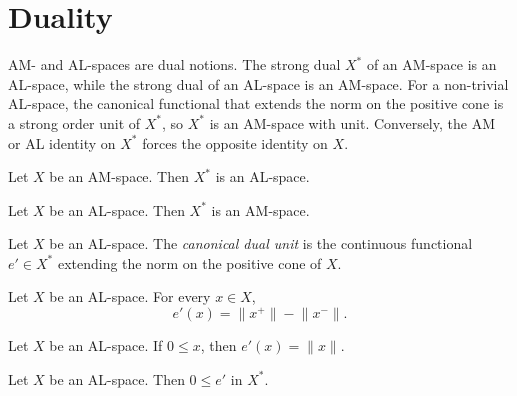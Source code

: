 \section{Duality}

AM- and AL-spaces are dual notions. The strong dual $X^{*}$ of an
AM-space is an AL-space, while the strong dual of an AL-space is an
AM-space. For a non-trivial AL-space, the canonical functional that
extends the norm on the positive cone is a strong order unit of
$X^{*}$, so $X^{*}$ is an AM-space with unit. Conversely, the AM or
AL identity on $X^{*}$ forces the opposite identity on $X$.

\begin{theorem}
\label{thm:strongDual-alSpace-of-amSpace}
\leanok
{}
Let $X$ be an AM-space. Then $X^{*}$ is an AL-space.
\end{theorem}

\begin{theorem}
\label{thm:strongDual-amSpace-of-alSpace}
\leanok
{}
Let $X$ be an AL-space. Then $X^{*}$ is an AM-space.
\end{theorem}

\begin{definition}
\label{def:alSpace-dualUnit}
\leanok
{}
Let $X$ be an AL-space. The \emph{canonical dual unit} is the
continuous functional $e' \in X^{*}$ extending the norm on the
positive cone of $X$.
\end{definition}

\begin{lemma}
\label{lem:alSpace-dualUnit-apply}
\leanok
{}
Let $X$ be an AL-space. For every $x \in X$,
\[
  e'(x) = \lVert x^{+}\rVert - \lVert x^{-}\rVert.
\]
\end{lemma}

\begin{lemma}
\label{lem:alSpace-dualUnit-apply-of-nonneg}
\leanok
{}
Let $X$ be an AL-space. If $0 \le x$, then
$e'(x)=\lVert x\rVert$.
\end{lemma}

\begin{lemma}
\label{lem:alSpace-dualUnit-nonneg}
\leanok
{}
Let $X$ be an AL-space. Then $0 \le e'$ in $X^{*}$.
\end{lemma}

